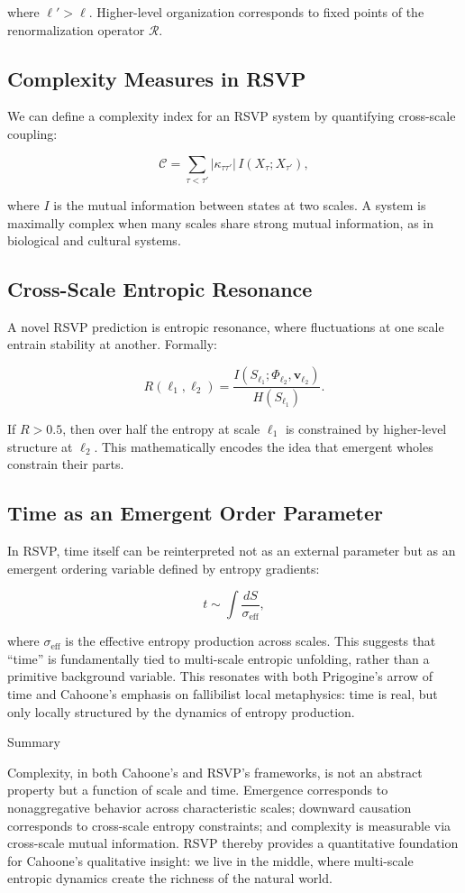 \documentclass[12pt]{book}
\begin{document}
where \( \ell' > \ell \). Higher-level organization corresponds to fixed points of the renormalization operator \( \mathcal{R} \).

\subsection{Complexity Measures in RSVP}
We can define a complexity index for an RSVP system by quantifying cross-scale coupling:

\[ \mathcal{C} = \sum_{\tau < \tau'} |\kappa_{\tau \tau'}| \, I(X_\tau; X_{\tau'}), \]

where \( I \) is the mutual information between states at two scales. A system is maximally complex when many scales share strong mutual information, as in biological and cultural systems.

\subsection{Cross-Scale Entropic Resonance}
A novel RSVP prediction is entropic resonance, where fluctuations at one scale entrain stability at another. Formally:

\[ R(\ell_1, \ell_2) = \frac{I(S_{\ell_1}; \Phi_{\ell_2}, \mathbf{v}_{\ell_2})}{H(S_{\ell_1})}. \]

If \( R > 0.5 \), then over half the entropy at scale \( \ell_1 \) is constrained by higher-level structure at \( \ell_2 \). This mathematically encodes the idea that emergent wholes constrain their parts.

\subsection{Time as an Emergent Order Parameter}
In RSVP, time itself can be reinterpreted not as an external parameter but as an emergent ordering variable defined by entropy gradients:

\[ t \sim \int \frac{dS}{\sigma_{\text{eff}}}, \]

where \( \sigma_{\text{eff}} \) is the effective entropy production across scales. This suggests that “time” is fundamentally tied to multi-scale entropic unfolding, rather than a primitive background variable. This resonates with both Prigogine’s arrow of time and Cahoone’s emphasis on fallibilist local metaphysics: time is real, but only locally structured by the dynamics of entropy production.

Summary

Complexity, in both Cahoone’s and RSVP’s frameworks, is not an abstract property but a function of scale and time. Emergence corresponds to nonaggregative behavior across characteristic scales; downward causation corresponds to cross-scale entropy constraints; and complexity is measurable via cross-scale mutual information. RSVP thereby provides a quantitative foundation for Cahoone’s qualitative insight: we live in the middle, where multi-scale entropic dynamics create the richness of the natural world.
\end{document}
